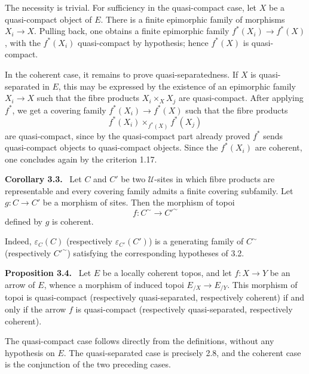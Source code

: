 \documentclass[11pt]{article}
\newcommand{\U}{\mathcal{U}}
\newenvironment{statement}[1]{\par\medskip\noindent\textbf{#1.}\ }{\par\medskip}
\begin{document}
The necessity is trivial. For sufficiency in the quasi-compact case, let \(X\) be a quasi-compact object of \(E\). There is a finite epimorphic family of morphisms \(X_i\to X\). Pulling back, one obtains a finite epimorphic family \(f^*(X_i)\to f^*(X)\), with the \(f^*(X_i)\) quasi-compact by hypothesis; hence \(f^*(X)\) is quasi-compact.

In the coherent case, it remains to prove quasi-separatedness. If \(X\) is quasi-separated in \(E\), this may be expressed by the existence of an epimorphic family \(X_i\to X\) such that the fibre products \(X_i\times_X X_j\) are quasi-compact. After applying \(f^*\), we get a covering family \(f^*(X_i)\to f^*(X)\) such that the fibre products
\[
 f^*(X_i)\times_{f^*(X)} f^*(X_j)
\]
are quasi-compact, since by the quasi-compact part already proved \(f^*\) sends quasi-compact objects to quasi-compact objects. Since the \(f^*(X_i)\) are coherent, one concludes again by the criterion 1.17.

\begin{statement}{Corollary 3.3}
Let \(C\) and \(C'\) be two \(\U\)-sites in which fibre products are representable and every covering family admits a finite covering subfamily. Let \(g:C\to C'\) be a morphism of sites. Then the morphism of topoi
\[
  f:C^{\sim}\to {C'}^{\sim}
\]
defined by \(g\) is coherent.
\end{statement}

Indeed, \(\varepsilon_C(C)\) (respectively \(\varepsilon_{C'}(C')\)) is a generating family of \(C^{\sim}\) (respectively \({C'}^{\sim}\)) satisfying the corresponding hypotheses of 3.2.

\begin{statement}{Proposition 3.4}
Let \(E\) be a locally coherent topos, and let \(f:X\to Y\) be an arrow of \(E\), whence a morphism of induced topoi \(E_{/X}\to E_{/Y}\). This morphism of topoi is quasi-compact (respectively quasi-separated, respectively coherent) if and only if the arrow \(f\) is quasi-compact (respectively quasi-separated, respectively coherent).
\end{statement}

The quasi-compact case follows directly from the definitions, without any hypothesis on \(E\). The quasi-separated case is precisely 2.8, and the coherent case is the conjunction of the two preceding cases.
\end{document}
